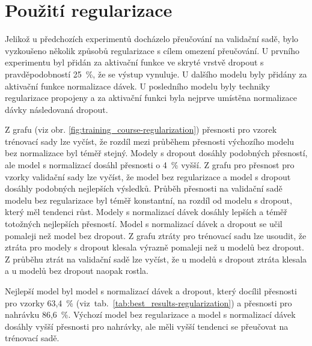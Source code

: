 \documentclass[FM,BP]{tulthesis}
\begin{document}
\section{Použití regularizace} %
Jelikož u předchozích experimentů docházelo přeučování na validační sadě, bylo vyzkoušeno několik způsobů regularizace s cílem omezení přeučování. U prvního experimentu byl přidán za aktivační funkce ve skryté vrstvě dropout s pravděpodobností \mbox{25 \%}, že se výstup vynuluje. U dalšího modelu byly přidány za aktivační funkce normalizace dávek. U posledního modelu byly techniky regularizace propojeny a za aktivační funkci byla nejprve umístěna normalizace dávky následovaná dropout.

Z grafu (viz obr. \mbox{\ref{fig:training_course-regularization}}) přesnosti pro vzorek trénovací sady lze vyčíst, že rozdíl mezi průběhem přesnosti výchozího modelu bez normalizace byl téměř stejný. Modely s dropout dosáhly podobných přesností, ale model s normalizací dosáhl přesnosti o \mbox{4 \%} vyšší. Z grafu pro přesnost pro vzorky validační sady lze vyčíst, že model bez regularizace a model s dropout dosáhly podobných nejlepších výsledků. Průběh přesnosti na validační sadě modelu bez regularizace byl téměř konstantní, na rozdíl od modelu s dropout, který měl tendenci růst. Modely s normalizací dávek dosáhly lepších a téměř totožných nejlepších přesností. Model s normalizací dávek a dropout se učil pomaleji než model bez dropout. Z grafu ztráty pro trénovací sadu lze usoudit, že ztráta pro modely s dropout klesala výrazně pomaleji než u modelů bez dropout. Z průběhu ztrát na validační sadě lze vyčíst, že u modelů s dropout ztráta klesala a u modelů bez dropout naopak rostla.

Nejlepší model byl model s normalizací dávek a dropout, který docílil přesnosti pro vzorky \mbox{63,4 \%} \mbox{(viz tab. \ref{tab:best_results-regularization})} a přesnosti pro nahrávku \mbox{86,6 \%}. Výchozí model bez regularizace a model s normalizací dávek dosáhly vyšší přesnosti pro nahrávky, ale měli vyšší tendenci se přeučovat na trénovací sadě.
\end{document}
